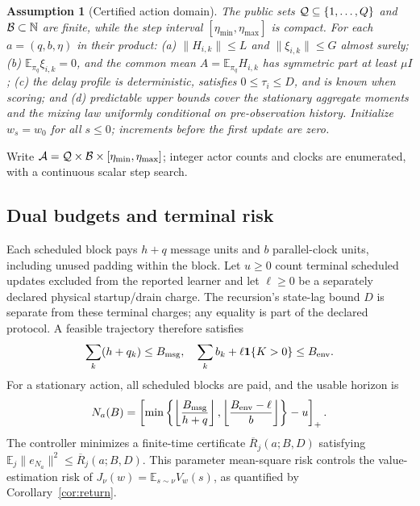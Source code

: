 \documentclass[journal]{IEEEtran}
\newtheorem{assumption}{Assumption}
\newcommand{\E}{\mathbb{E}}
\newcommand{\A}{\mathcal{A}}
\begin{document}
\begin{assumption}[Certified action domain]
The public sets ${\cal Q}\subseteq\{1,\ldots,Q\}$ and ${\cal B}\subset\mathbb N$ are finite, while the step interval $[\eta_{\min},\eta_{\max}]$ is compact.
For each $a=(q,b,\eta)$ in their product: (a) $\|H_{i,k}\|\le L$ and $\|\xi_{i,k}\|\le G$ almost surely; (b) $\E_{\pi_q}\xi_{i,k}=0$, and the common mean $A=\E_{\pi_q}H_{i,k}$ has symmetric part at least $\mu I$; (c) the delay profile is deterministic, satisfies $0\le\tau_i\le D$, and is known when scoring; and (d) predictable upper bounds cover the stationary aggregate moments and the mixing law uniformly conditional on pre-observation history.
Initialize $w_s=w_0$ for all $s\le0$; increments before the first update are zero.
\label{ass:catalogue}
\end{assumption}

Write $\A={\cal Q}\times{\cal B}\times[\eta_{\min},\eta_{\max}]$; integer actor counts and clocks are enumerated, with a continuous scalar step search.

\subsection{Dual budgets and terminal risk}
Each scheduled block pays $h+q$ message units and $b$ parallel-clock units, including unused padding within the block.
Let $u\ge0$ count terminal scheduled updates excluded from the reported learner and let $\ell\ge0$ be a separately declared physical startup/drain charge.
The recursion's state-lag bound $D$ is separate from these terminal charges; any equality is part of the declared protocol.
A feasible trajectory therefore satisfies
\begin{equation}
\sum_k(h+q_k)\le B_{\rm msg},
\quad
\sum_k b_k+\ell\mathbf{1}\{K>0\}\le B_{\rm env}.
\label{eq:budgets}
\end{equation}
For a stationary action, all scheduled blocks are paid, and the usable horizon is
\begin{equation}
N_a(B)=\left[\min\left\{\left\lfloor\frac{B_{\rm msg}}{h+q}\right\rfloor,
\left\lfloor\frac{B_{\rm env}-\ell}{b}\right\rfloor\right\}-u\right]_+.
\label{eq:usable-horizon}
\end{equation}
The controller minimizes a finite-time certificate $\overline R_j(a;B,D)$ satisfying $\E_j\|e_{N_a}\|^2\le\overline R_j(a;B,D)$.
This parameter mean-square risk controls the value-estimation risk of $J_\nu(w)=\E_{s\sim\nu}V_w(s)$, as quantified by Corollary~\ref{cor:return}.
\end{document}
